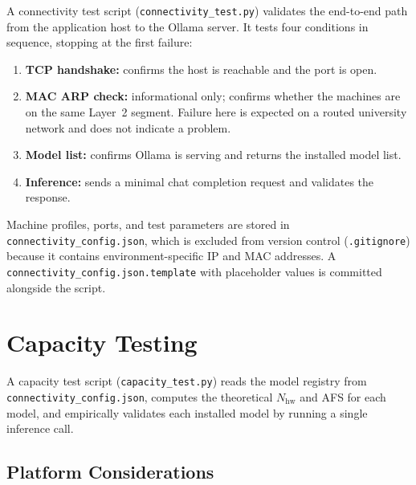 A connectivity test script (\texttt{connectivity\_test.py}) validates the
end-to-end path from the application host to the Ollama server. It tests
four conditions in sequence, stopping at the first failure:

\begin{enumerate}
  \item \textbf{TCP handshake:} confirms the host is reachable and the
        port is open.
  \item \textbf{MAC ARP check:} informational only; confirms whether the
        machines are on the same Layer~2 segment. Failure here is expected
        on a routed university network and does not indicate a problem.
  \item \textbf{Model list:} confirms Ollama is serving and returns the
        installed model list.
  \item \textbf{Inference:} sends a minimal chat completion request and
        validates the response.
\end{enumerate}

Machine profiles, ports, and test parameters are stored in
\texttt{connectivity\_config.json}, which is excluded from version control
(\texttt{.gitignore}) because it contains environment-specific IP and MAC
addresses. A \texttt{connectivity\_config.json.template} with placeholder
values is committed alongside the script.

\section{Capacity Testing}
\label{sec:capacity}

A capacity test script (\texttt{capacity\_test.py}) reads the model
registry from \texttt{connectivity\_config.json}, computes the
theoretical $N_{\text{hw}}$ and AFS for each model, and empirically
validates each installed model by running a single inference call.

\subsection{Platform Considerations}

